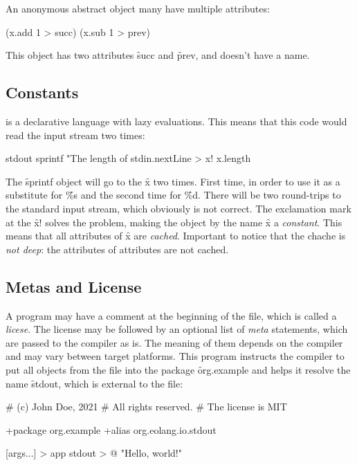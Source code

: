 An anonymous abstract object many have multiple attributes:

\begin{eocode}
[x] (x.add 1 > succ) (x.sub 1 > prev)
\end{eocode}

This object has two attributes \f{succ} and \f{prev}, and doesn't
have a name.

\subsection{Constants}

\eo{} is a declarative language with lazy evaluations. This means
that this code would read the input stream two times:

\begin{eocode}
stdout
  sprintf
    "The length of %
    stdin.nextLine > x!
    x.length
\end{eocode}

The \f{sprintf} object will go to the \f{x} two times. First time,
in order to use it as a substitute for \f{\%s} and the second time for
\f{\%d}. There will be two round-trips to the standard input stream, which
obviously is not correct. The exclamation mark at the \f{x!} solves the
problem, making the object by the name \f{x} a \emph{constant}. This means
that all attributes of \f{x} are \emph{cached}. Important to notice
that the chache is \emph{not deep}: the attributes of attributes are not cached.

\subsection{Metas and License}

A program may have a comment at the beginning of the file, which
is called a \emph{licese}. The license may be followed by an optional
list of \emph{meta} statements, which are passed to the compiler
as is. The meaning of them depends on the compiler and may vary
between target platforms. This program instructs the compiler
to put all objects from the file into the package \f{org.example}
and helps it resolve the name \f{stdout}, which is external
to the file:

\begin{eocode}
# (c) John Doe, 2021
# All rights reserved.
# The license is MIT

+package org.example
+alias org.eolang.io.stdout

[args...] > app
  stdout > @
    "Hello, world!\n"
\end{eocode}

